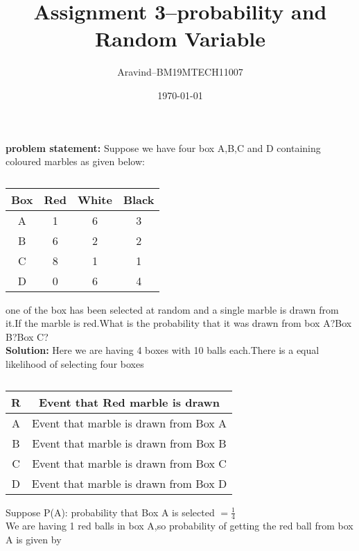 \documentclass[11pt,a4paper,twocolumn]{article}
\title{\textbf{Assignment 3--probability and Random Variable}}
\author{Aravind--BM19MTECH11007}
\date{\today}
\begin{document}
\maketitle
\textbf{problem statement:} Suppose we have four box A,B,C and D containing coloured marbles as given below:
\begin{table}[h]
\centering
\caption{}

\begin{tabular}{|c|c|c|c|}
\hline
Box & Red & White & Black\\
\hline
A & 1&6&3\\
B&6&2&2\\
C&8&1&1\\
D&0&6&4\\
\hline
\end{tabular}
\end{table}
one of the box has been selected at random and a single marble is drawn from it.If the marble is red.What is the probability that it was drawn from box A?Box B?Box C?
\\
\textbf{Solution:}
Here we are having 4 boxes with 10 balls each.There is a equal likelihood of selecting  four boxes
\\
\begin{table}[h]
\centering
\caption{}
\begin{tabular}{|c|c|}
\hline
R&Event that Red marble is drawn\\
\hline
A&Event that marble is drawn from Box A\\
\hline
B&Event that marble is drawn from Box B\\
\hline
C&Event that marble is drawn from Box C\\
\hline
D&Event that marble is drawn from Box D\\
\hline
\end{tabular}
\end{table}
Suppose
P(A): probability that  Box A is selected  $=\frac{1}{
4}$
\\We are having 1 red balls in box A,so probability of getting the red ball from box A is given by
\end{document}
